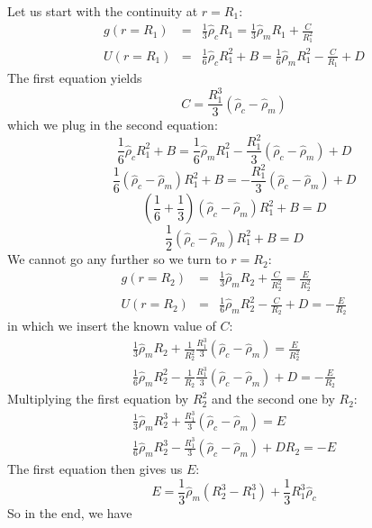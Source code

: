 Let us start with the continuity at $r=R_1$:
\begin{eqnarray}
g(r=R_1) &=& \frac{1}{3}\hat{\rho}_c R_1 =  
\frac{1}{3}\hat{\rho}_m R_1 +\frac{C}{R_1^2} \\
U(r=R_1)&=& \frac{1}{6}\hat{\rho}_c R_1^2   + B =
\frac{1}{6}\hat{\rho}_m R_1^2  -\frac{C}{R_1} + D 
\end{eqnarray}
The first equation yields
\[
C=\frac{R_1^3}{3} (\hat{\rho}_c-\hat{\rho}_m)
\]
which we plug in the second equation:
\[
\frac{1}{6}\hat{\rho}_c R_1^2   + B =
\frac{1}{6}\hat{\rho}_m R_1^2  -\frac{R_1^2}{3} (\hat{\rho}_c-\hat{\rho}_m)   + D 
\]
\[
\frac{1}{6}(\hat{\rho}_c-\hat{\rho}_m) R_1^2   + B =
 -\frac{R_1^2}{3} (\hat{\rho}_c-\hat{\rho}_m)   + D 
\]
\[
(\frac{1}{6}+\frac13)(\hat{\rho}_c-\hat{\rho}_m) R_1^2   + B = D 
\]
\[
\frac12(\hat{\rho}_c-\hat{\rho}_m) R_1^2   + B = D 
\]
We cannot go any further so we turn to $r=R_2$:
\begin{eqnarray}
g(r=R_2)&=& \frac{1}{3}\hat{\rho}_m R_2 +\frac{C}{R_2^2}= \frac{E}{R_2^2} \\
U(r=R_2)&=& \frac{1}{6}\hat{\rho}_m R_2^2  -\frac{C}{R_2} + D = -\frac{E}{R_2}   
\end{eqnarray}
in which we insert the known value of $C$:
\begin{eqnarray}
\frac{1}{3}\hat{\rho}_m R_2 +\frac{1}{R_2^2} \frac{R_1^3}{3} (\hat{\rho}_c-\hat{\rho}_m)   = \frac{E}{R_2^2} \\
\frac{1}{6}\hat{\rho}_m R_2^2  -\frac{1}{R_2}\frac{R_1^3}{3} (\hat{\rho}_c-\hat{\rho}_m) + D = -\frac{E}{R_2}   
\end{eqnarray}
Multiplying the first equation by $R_2^2$ and the second one by $R_2$:
\begin{eqnarray}
\frac{1}{3}\hat{\rho}_m R_2^3 +  \frac{R_1^3}{3} (\hat{\rho}_c-\hat{\rho}_m) = E \\
\frac{1}{6}\hat{\rho}_m R_2^3  -\frac{R_1^3}{3} (\hat{\rho}_c-\hat{\rho}_m) + D R_2=-E
\end{eqnarray}
The first equation then gives us $E$:
\[
E=\frac13 \hat{\rho}_m (R_2^3-R_1^3) +  \frac13 R_1^3 \hat{\rho}_c
\]
So in the end, we have
